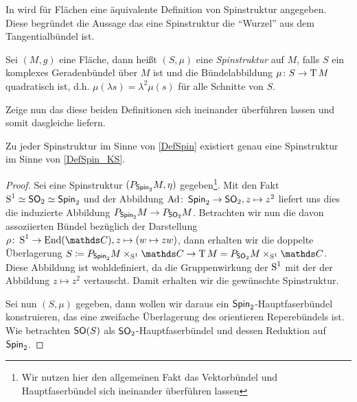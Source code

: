 In \cite{KS96} wird für Flächen eine äquivalente Definition
von Spinstruktur angegeben. Diese begründet die Aussage das
eine Spinstruktur die \enquote{Wurzel} aus dem Tangentialbündel ist.

\begin{Def}\label{DefSpin_KS}
	Sei $ (M,g) $ eine Fläche, dann heißt $ (S,\mu) $ eine
	\textit{Spinstruktur} auf $ M $, falls $ S $ ein komplexes Geradenbündel
	über $ M $ ist und die Bündelabbildung $ \abb{\mu}{S}{\TT M} $ quadratisch	ist, d.h. $ \mu(\lambda s) = \lambda^2 \mu(s) $ für alle Schnitte
	von $ S $.
\end{Def}

Zeige nun das diese beiden Definitionen sich ineinander überführen
lassen und somit dasgleiche liefern.

\begin{Satz}
	Zu jeder Spinstruktur im Sinne von \cref{DefSpin} existiert
	genau eine Spinstruktur im Sinne von \cref{DefSpin_KS}.
	\begin{proof}
		Sei eine Spinstruktur $ (\Ph{\spin_2}{M},\eta) $ gegeben\footnote{Wir nutzen hier den allgemeinen Fakt das Vektorbündel und Hauptfaserbündel sich ineinander überführen lassen}.
		Mit den Fakt $ \S^1\simeq\so_2\simeq\spin_2 $ und der Abbildung
		$ \abb{\Ad}{\spin_2}{\so_2},z\mapsto z^2 $ liefert uns dies
		die induzierte Abbildung $ \Ph{\spin_2}{M}\rightarrow \Ph{\so_2}{M} $. Betrachten wir nun die davon assoziierten
		Bündel bezüglich der Darstellung $ \abb{\rho}{\S^1}{\End(\c)}, z\mapsto (w \mapsto zw) $, dann erhalten wir die doppelte
		Überlagerung $ S\coloneqq \Ph{\spin_2}{M}\times_{\S^1}\c \rightarrow {\TT M = \Ph{\so_2}{M}\times_{\S^1}\c} $. Diese Abbildung ist wohldefiniert, da die Gruppenwirkung der $ \S^1 $ mit der
	    der Abbildung $ z\mapsto z^2 $ vertauscht. Damit erhalten
	    wir die gewünschte Spinstruktur.
	    
	    Sei nun $ (S,\mu) $ gegeben, dann wollen wir daraus ein $ \spin_2 $-Hauptfaserbündel konstruieren, das eine zweifache Überlagerung des
	    orientieren Reperebündels ist. Wie betrachten $ \so(S) $ 
	    als $ \so_2 $-Hauptfaserbündel und dessen Reduktion auf $ \spin_2 $.
	    
	    
%	    
	    
		
	\end{proof}
\end{Satz}



